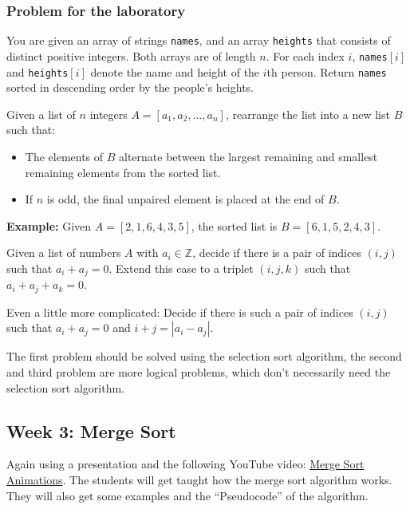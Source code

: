 \documentclass[10pt, oneside]{article}
\theoremstyle{remark}
\begin{document}
\subsubsection*{Problem for the laboratory}
\begin{tcolorbox}
  You are given an array of strings \texttt{names}, and an array \texttt{heights} that consists of distinct positive integers. Both arrays are of length $n$. For each index $i$, \texttt{names}$[i]$ and \texttt{heights}$[i]$ denote the name and height of the $i$th person. Return \texttt{names} sorted in descending order by the people's heights.

  \vspace{1em}

  Given a list of $n$ integers $A = [a_1, a_2, \dots, a_n]$, rearrange the list into a new list $B$ such that:
  \begin{itemize}
      \item The elements of $B$ alternate between the largest remaining and smallest remaining elements from the sorted list.
      \item If $n$ is odd, the final unpaired element is placed at the end of $B$.
  \end{itemize}
  \textbf{Example:} Given $A = [2, 1, 6, 4, 3, 5]$, the sorted list is $B = [6, 1, 5, 2, 4, 3]$.

  \vspace{1em}

  Given a list of numbers $A$ with $a_i \in \mathbb{Z}$, decide if there is a pair of indices $(i, j)$ such that $a_i + a_j = 0$. Extend this case to a triplet $(i, j, k)$ such that $a_i + a_j + a_k = 0$.

  \vspace{1em}
  Even a little more complicated: Decide if there is such a pair of indices $(i, j)$ such that $a_i + a_j = 0$ and $i + j = |a_i - a_j|$.
\end{tcolorbox}
The first problem should be solved using the selection sort algorithm, the second and third problem are more logical problems, which don't necessarily need the selection sort algorithm.

\subsection{Week 3: Merge Sort}
Again using a presentation and the following YouTube video: \href{https://www.youtube.com/watch?v=ZRPoEKHXTJg}{Merge Sort Animations}. The students will get taught how the merge sort algorithm works. They will also get some examples and the \enquote{Pseudocode} of the algorithm.
\end{document}
